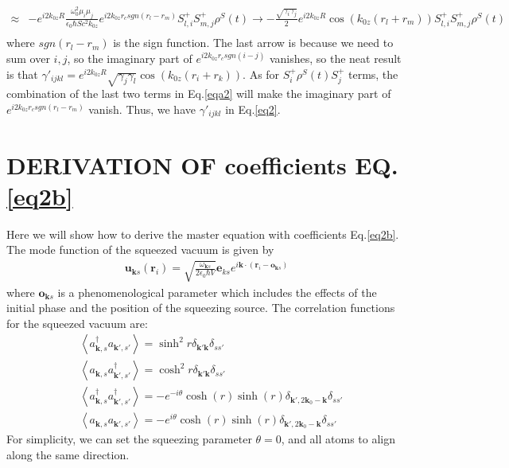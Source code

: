\documentclass[aps,showpacs,twocolumn,twoside,groupedaddress]{revtex4}
\let\vec\bm
\begin{document}
\begin{widetext}
\begin{equation}
\begin{split}
\approx&-e^{i2k_{0z}R}\frac{\omega_{0}^{2}\mu_{i}\mu_{j}}{\epsilon_{0}\hbar Sc^{2}k_{0z}}e^{i2k_{0z}r_{c}sgn(r_{l}-r_{m})}S_{l,i}^{+}S_{m,j}^{+}\rho^{S}(t)\rightarrow-\frac{\sqrt{\gamma_{i}\gamma_{j}}}{2}e^{i2k_{0z}R}\cos(k_{0z}(r_{l}+r_{m}))S_{l,i}^{+}S_{m,j}^{+}\rho^{S}(t)\\
\end{split}
\end{equation}
where $sgn(r_{l}-r_{m})$ is the sign function. The last arrow is because we need to sum over $i,j$, so the imaginary part of $e^{i2k_{0z}r_{c}sgn(i-j)}$ vanishes, so the neat result is that $\gamma'_{ijkl}=e^{i2k_{0z}R}\sqrt{\gamma_{j}\gamma_{l}}\cos(k_{0z}(r_{i}+r_{k}))$. As for $S_{i}^{+}\rho^{S}(t)S_{j}^{+}$ terms, the combination of the last two terms in Eq.\eqref{eqa2} will make the imaginary part of $e^{i2k_{0z}r_{c}sgn(r_{l}-r_{m})}$ vanish. Thus, we have $\gamma'_{ijkl}$ in Eq.\eqref{eq2}. 

\section{DERIVATION OF coefficients EQ.\eqref{eq2b} }
Here we will show how to derive the master equation with coefficients Eq.\eqref{eq2b}. The mode function of the squeezed vacuum is given by
\begin{equation}
  \label{eq2b}
  \begin{gathered}
\vec{u}_{\vec{k}s}(\vec{r}_{i})=\sqrt{\frac{\omega_{\vec{k}s}}{2\epsilon_{0}\hbar V}}\vec{e}_{ks}e^{i\vec{k}\cdot(\vec{r}_{i}-\vec{o}_{\vec{k}s})}
 \end{gathered}
\end{equation}
where $\vec{o}_{\vec{k}s} $ is a phenomenological parameter which includes the effects of the initial phase and the position of the squeezing source\cite{You2018}. The correlation functions for the squeezed vacuum are\cite{scully1999quantum}:
\begin{equation}
\label{eq0a}
\begin{split}
& \left\langle a_{\vec{k},s}^{\dagger}a_{\vec{k}',s'}\right\rangle =\sinh^{2}r\delta_{\vec{k}'\vec{k}}\delta_{ss'} \\
& \left\langle a_{\vec{k},s}a_{\vec{k}',s'}^{\dagger}\right\rangle =\cosh^{2}r\delta_{\vec{k}'\vec{k}}\delta_{ss'}\\
& \left\langle a_{\vec{k},s}^{\dagger}a_{\vec{k}',s'}^{\dagger}\right\rangle =-e^{-i\theta}\cosh(r)\sinh(r)\delta_{\vec{k}',2\vec{k}_{0}-\vec{k}}\delta_{ss'}\\
&\left\langle a_{\vec{k},s}a_{\vec{k}',s'}\right\rangle =-e^{i\theta}\cosh(r)\sinh(r)\delta_{\vec{k}',2\vec{k}_{0}-\vec{k}}\delta_{ss'}
\end{split}
\end{equation}
For simplicity, we can set the squeezing parameter $\theta=0$, and all atoms to align along the same direction.


\end{widetext}
\end{document}
